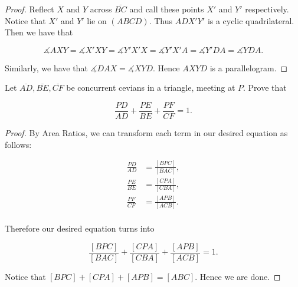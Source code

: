 \documentclass[letterpaper,oneside]{scrartcl}
\begin{document}
\begin{proof}  Reflect $X$ and $Y$ across $\overline{BC}$ and call these points $X'$ and $Y'$ respectively. Notice that $X'$ and $Y'$ lie on $({ABCD}).$ Thus ${ADX'Y'}$ is a cyclic quadrilateral. Then we have that

  $$\measuredangle {AXY} = \measuredangle {X'XY}= \measuredangle {Y'X'X} = \measuredangle {Y'X'A} = \measuredangle {Y'DA} = \measuredangle {YDA}.$$

  Similarly, we have that $\measuredangle {DAX} = \measuredangle {XYD}.$ Hence ${AXYD}$ is a parallelogram.
\end{proof}

\begin{problem*}
  [3.18]
  Let $\overline{AD}, \overline{BE}, \overline{CF}$ be concurrent cevians in a triangle, meeting at $P$. Prove that

  $$\frac{PD}{AD} + \frac{PE}{BE} + \frac{PF}{CF} = 1.$$
\end{problem*}

\begin{proof}  By Area Ratios, we can transform each term in our desired equation as follows:

  \begin{align*}
    \frac{PD}{AD} & = \frac{[BPC]}{[BAC]}, \\
    \frac{PE}{BE} & = \frac{[CPA]}{[CBA]}, \\
    \frac{PF}{CF} & = \frac{[APB]}{[ACB]}. \\
  \end{align*}

  Therefore our desired equation turns into

  $$\frac{[BPC]}{[BAC]} + \frac{[CPA]}{[CBA]} +\frac{[APB]}{[ACB]} = 1.$$

  Notice that $[{BPC}] + [{CPA}] + [{APB}] = [{ABC}].$ Hence we are done. \end{proof}
\end{document}

